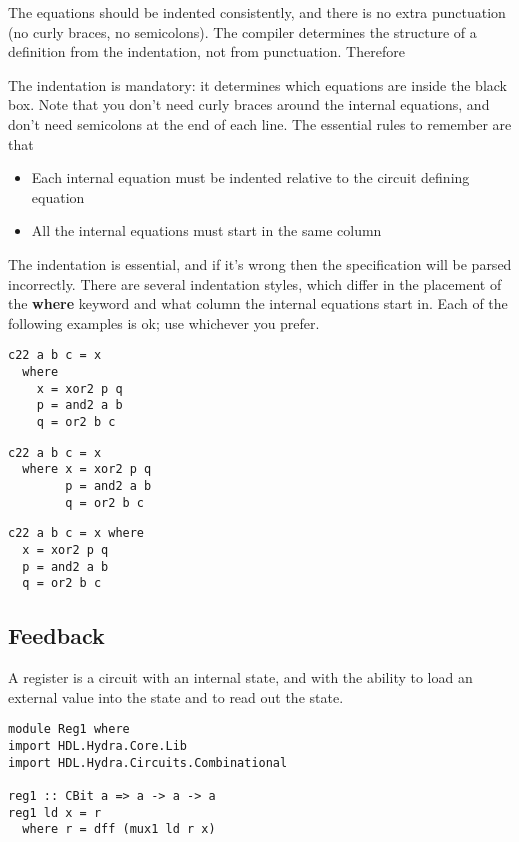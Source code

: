 \documentclass[11pt]{article}
\begin{document}
The equations should be indented consistently, and there is no extra
punctuation (no curly braces, no semicolons).  The compiler determines
the structure of a definition from the indentation, not from
punctuation.  Therefore 

The indentation is mandatory: it determines which equations are inside
the black box.  Note that you don't need curly braces around the
internal equations, and don't need semicolons at the end of each line.
The essential rules to remember are that

\begin{itemize}
\item Each internal equation must be indented relative to the circuit
defining equation
\item All the internal equations must start in the same column
\end{itemize}

The indentation is essential, and if it's wrong then the specification
will be parsed incorrectly.  There are several indentation styles,
which differ in the placement of the \textbf{where} keyword and what column
the internal equations start in.  Each of the following examples is
ok; use whichever you prefer.

\begin{verbatim}
c22 a b c = x
  where
    x = xor2 p q
    p = and2 a b
    q = or2 b c
\end{verbatim}

\begin{verbatim}
c22 a b c = x
  where x = xor2 p q
        p = and2 a b
        q = or2 b c
\end{verbatim}

\begin{verbatim}
c22 a b c = x where
  x = xor2 p q
  p = and2 a b
  q = or2 b c
\end{verbatim}


\subsection{Feedback}
\label{sec:org81aa538}

A register is a circuit with an internal state, and with the ability
to load an external value into the state and to read out the state.



\begin{verbatim}
module Reg1 where
import HDL.Hydra.Core.Lib
import HDL.Hydra.Circuits.Combinational

reg1 :: CBit a => a -> a -> a
reg1 ld x = r
  where r = dff (mux1 ld r x)
\end{verbatim}
\end{document}
